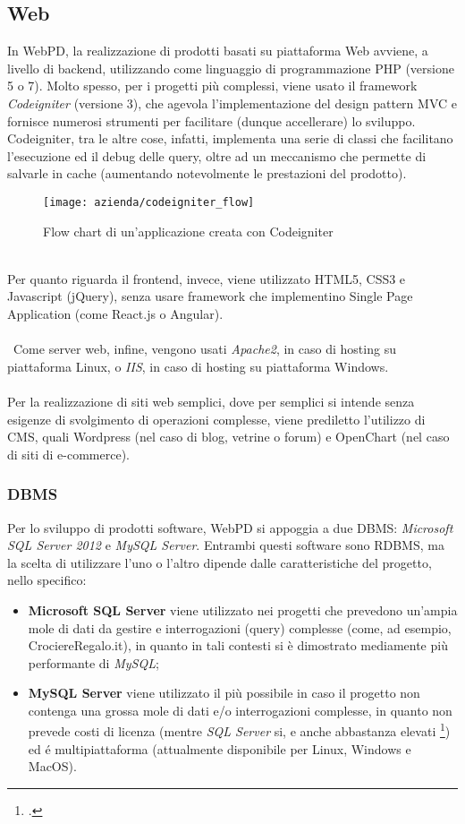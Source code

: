 \subsection{Web}
In WebPD, la realizzazione di prodotti basati su piattaforma Web avviene, a livello di backend, utilizzando come linguaggio di programmazione PHP (versione 5 o 7). Molto spesso, per i progetti più complessi, viene usato il framework \textit{Codeigniter} (versione 3), che agevola l'implementazione del design pattern MVC e fornisce numerosi strumenti per facilitare (dunque accellerare) lo sviluppo. Codeigniter, tra le altre cose, infatti, implementa una serie di classi che facilitano l'esecuzione ed il debug delle query, oltre ad un meccanismo che permette di salvarle in cache (aumentando notevolmente le prestazioni del prodotto).\\
\begin{figure}[!h] 
	\centering 
	\texttt{[image: azienda/codeigniter\_flow]} 
	\caption{Flow chart di un'applicazione creata con Codeigniter}
\end{figure}\\
Per quanto riguarda il frontend, invece, viene utilizzato HTML5, CSS3 e Javascript (jQuery), senza usare framework che implementino Single Page Application (come React.js o Angular).\\\\\
Come server web, infine, vengono usati \textit{Apache2}, in caso di hosting su piattaforma Linux, o  \textit{IIS}, in caso di hosting su piattaforma Windows.\\\\
Per la realizzazione di siti web semplici, dove per semplici si intende senza esigenze di svolgimento di operazioni complesse, viene prediletto l'utilizzo di CMS, quali Wordpress (nel caso di blog, vetrine o forum) e OpenChart (nel caso di siti di e-commerce).

\subsubsection{DBMS}
Per lo sviluppo di prodotti software, WebPD si appoggia a due DBMS: \textit{Microsoft SQL Server 2012} e \textit{MySQL Server}. Entrambi questi software sono RDBMS, ma la scelta di utilizzare l'uno o l'altro dipende dalle caratteristiche del progetto, nello specifico: \begin{itemize}
	\item \textbf{Microsoft SQL Server} viene utilizzato nei progetti che prevedono un'ampia mole di dati da gestire e interrogazioni (query) complesse (come, ad esempio, CrociereRegalo.it), in quanto in tali contesti si è dimostrato mediamente più performante di \textit{MySQL};
	\item \textbf{MySQL Server} viene utilizzato il più possibile in caso il progetto non contenga una grossa mole di dati e/o interrogazioni complesse, in quanto non prevede costi di licenza (mentre \textit{SQL Server} si, e anche abbastanza elevati \footcite{site:sql-server-pricing}) ed é multipiattaforma (attualmente disponibile per Linux, Windows e MacOS).
\end{itemize}

